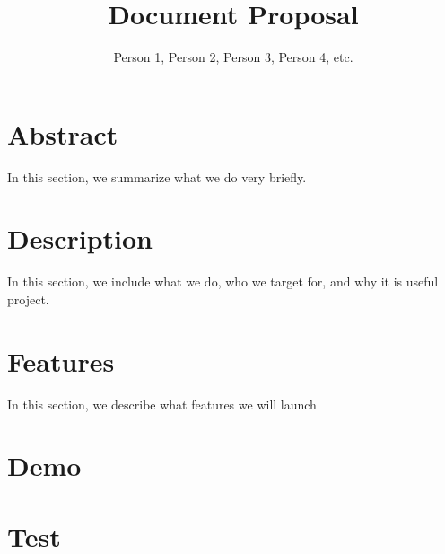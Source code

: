 \documentclass[twocolumn]{article}
\title{Document Proposal}
\author{Person 1, Person 2, Person 3, Person 4, etc.}
\begin{document}
\maketitle



\section{Abstract}
In this section, we summarize what we do very briefly.\\
\lipsum[1]

\section{Description}
In this section, we include what we do, who we target for, and why it is useful project.\\
\lipsum[2]
\lipsum[2]
\lipsum[2]

\section{Features}
In this section, we describe what features we will launch\\
\lipsum[3]
\lipsum[3]

\section{Demo}
\lipsum[4]

\section{Test}
\lipsum[5]
\end{document}
